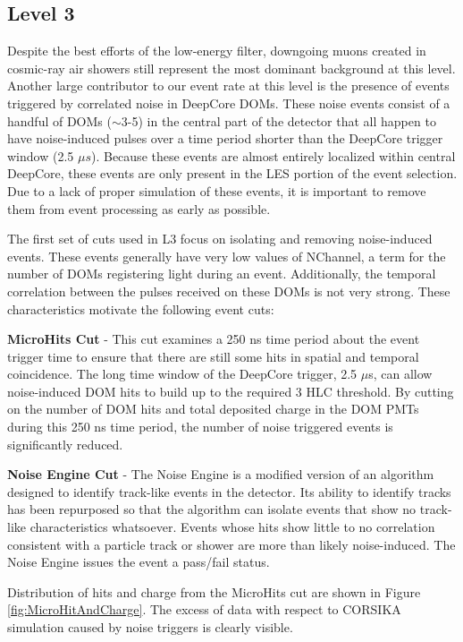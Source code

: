 \documentclass{gatech-thesis}
\begin{document}
\subsection{Level 3}
Despite the best efforts of the low-energy filter, downgoing muons created in cosmic-ray air showers still represent the most dominant background at this level. Another large contributor to our event rate at this level is the presence of events triggered by correlated noise in DeepCore DOMs. These noise events consist of a handful of DOMs ($\sim$3-5) in the central part of the detector that all happen to have noise-induced pulses over a time period shorter than the DeepCore trigger window (2.5 $\mu s$). Because these events are almost entirely localized within central DeepCore, these events are only present in the LES portion of the event selection. Due to a lack of proper simulation of these events, it is important to remove them from event processing as early as possible.

The first set of cuts used in L3 focus on isolating and removing noise-induced events. These events generally have very low values of NChannel, a term for the number of DOMs registering light during an event. Additionally, the temporal correlation between the pulses received on these DOMs is not very strong. These characteristics motivate the following event cuts:
\begin{adjustwidth}{2.5em}{2.5em}
\setlength{\parindent}{0pt}
\textbf{MicroHits Cut} - This cut examines a 250 ns time period about the event trigger time to ensure that there are still some hits in spatial and temporal coincidence. The long time window of the DeepCore trigger, 2.5 $\mu$s, can allow noise-induced DOM hits to build up to the required 3 HLC threshold. By cutting on the number of DOM hits and total deposited charge in the DOM PMTs during this 250 ns time period, the number of noise triggered events is significantly reduced.

\textbf{Noise Engine Cut} - The Noise Engine is a modified version of an algorithm designed to identify track-like events in the detector. Its ability to identify tracks has been repurposed so that the algorithm can isolate events that show no track-like characteristics whatsoever. Events whose hits show little to no correlation consistent with a particle track or shower are more than likely noise-induced. The Noise Engine issues the event a pass/fail status.
\end{adjustwidth}
\setlength{\parindent}{17.5pt}
Distribution of hits and charge from the MicroHits cut are shown in Figure \ref{fig:MicroHitAndCharge}. The excess of data with respect to CORSIKA simulation caused by noise triggers is clearly visible.
\end{document}
